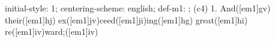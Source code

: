 initial-style: 1;
centering-scheme: english;
def-m1: \grealign;
(c4) 1. And([em1]gv) their([em1]hj) ex([em1]jv)ceed([em1]ji)ing([em1]hg) great([em1]hi) re([em1]iv)ward;([em1]iv)